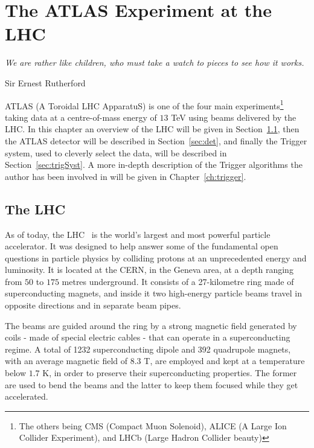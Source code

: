 \chapter{The ATLAS Experiment at the LHC}
\label{ch:detector}
\epigraph{\emph{We are rather like children, who must take a watch to pieces to see how it works.}}{Sir Ernest Rutherford}

	\acs{ATLAS} (A Toroidal LHC ApparatuS) is one of the four main experiments\footnote{The others being CMS (Compact Muon Solenoid), ALICE (A Large Ion Collider Experiment), and LHCb (Large Hadron Collider beauty)} taking data at a centre-of-mass energy of $13$ TeV using beams delivered by the \ac{LHC}. In this chapter an overview of the \ac{LHC} will be given in Section~\ref{sec:lhc}, then the \ac{ATLAS} detector will be described in Section~\ref{sec:det}, and finally the Trigger system, used to cleverly select the data, will be described in Section~\ref{sec:trigSyst}. A more in-depth description of the Trigger algorithms the author has been involved in will be given in Chapter~\ref{ch:trigger}.


	\section{The LHC}
	\label{sec:lhc}
	
		As of today, the \ac{LHC}~\cite{LHCDesignReport} is the world’s largest and most powerful particle accelerator. It was designed to help answer some of the fundamental open questions in particle physics by colliding protons at an unprecedented energy and luminosity. It is located at the \ac{CERN}, in the Geneva area, at a depth ranging from $50$ to $175$ metres underground. It consists of a 27-kilometre ring made of superconducting magnets, and inside it two high-energy particle beams travel in opposite directions and in separate beam pipes. 

		The beams are guided around the ring by a strong magnetic field generated by coils - made of special electric cables - that can operate in a superconducting regime. A total of 1232 superconducting dipole and 392 quadrupole magnets, with an average magnetic field of $8.3$ T, are employed and kept at a temperature below $1.7$ K, in order to preserve their superconducting properties. The former are used to bend the beams and the latter to keep them focused while they get accelerated. 
		
